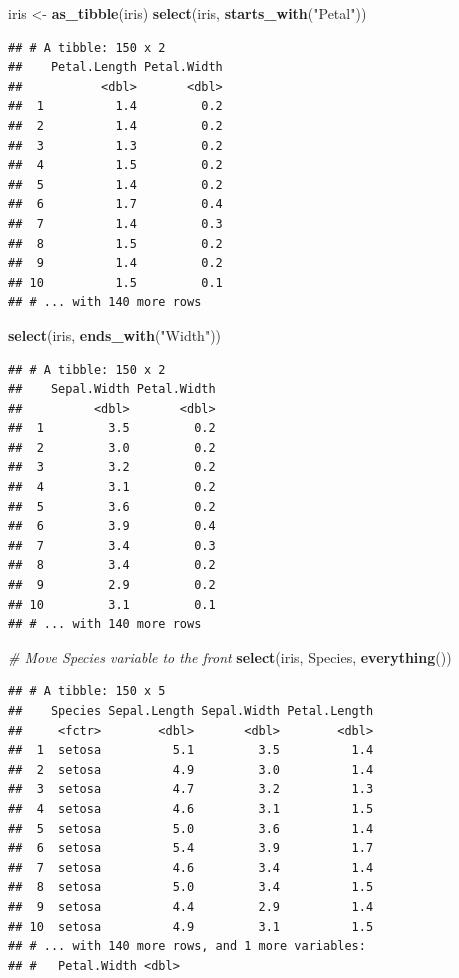 \documentclass[]{book}
\newenvironment{Shaded}{\begin{snugshade}}{\end{snugshade}}
\newcommand{\KeywordTok}[1]{\textcolor[rgb]{0.13,0.29,0.53}{\textbf{#1}}}
\newcommand{\StringTok}[1]{\textcolor[rgb]{0.31,0.60,0.02}{#1}}
\newcommand{\CommentTok}[1]{\textcolor[rgb]{0.56,0.35,0.01}{\textit{#1}}}
\newcommand{\NormalTok}[1]{#1}
\begin{document}
\begin{Shaded}
\begin{Highlighting}[]
\NormalTok{iris <-}\StringTok{ }\KeywordTok{as_tibble}\NormalTok{(iris)}
\KeywordTok{select}\NormalTok{(iris, }\KeywordTok{starts_with}\NormalTok{(}\StringTok{"Petal"}\NormalTok{))}
\end{Highlighting}
\end{Shaded}

\begin{verbatim}
## # A tibble: 150 x 2
##    Petal.Length Petal.Width
##           <dbl>       <dbl>
##  1          1.4         0.2
##  2          1.4         0.2
##  3          1.3         0.2
##  4          1.5         0.2
##  5          1.4         0.2
##  6          1.7         0.4
##  7          1.4         0.3
##  8          1.5         0.2
##  9          1.4         0.2
## 10          1.5         0.1
## # ... with 140 more rows
\end{verbatim}

\begin{Shaded}
\begin{Highlighting}[]
\KeywordTok{select}\NormalTok{(iris, }\KeywordTok{ends_with}\NormalTok{(}\StringTok{"Width"}\NormalTok{))}
\end{Highlighting}
\end{Shaded}

\begin{verbatim}
## # A tibble: 150 x 2
##    Sepal.Width Petal.Width
##          <dbl>       <dbl>
##  1         3.5         0.2
##  2         3.0         0.2
##  3         3.2         0.2
##  4         3.1         0.2
##  5         3.6         0.2
##  6         3.9         0.4
##  7         3.4         0.3
##  8         3.4         0.2
##  9         2.9         0.2
## 10         3.1         0.1
## # ... with 140 more rows
\end{verbatim}

\begin{Shaded}
\begin{Highlighting}[]
\CommentTok{# Move Species variable to the front}
\KeywordTok{select}\NormalTok{(iris, Species, }\KeywordTok{everything}\NormalTok{())}
\end{Highlighting}
\end{Shaded}

\begin{verbatim}
## # A tibble: 150 x 5
##    Species Sepal.Length Sepal.Width Petal.Length
##     <fctr>        <dbl>       <dbl>        <dbl>
##  1  setosa          5.1         3.5          1.4
##  2  setosa          4.9         3.0          1.4
##  3  setosa          4.7         3.2          1.3
##  4  setosa          4.6         3.1          1.5
##  5  setosa          5.0         3.6          1.4
##  6  setosa          5.4         3.9          1.7
##  7  setosa          4.6         3.4          1.4
##  8  setosa          5.0         3.4          1.5
##  9  setosa          4.4         2.9          1.4
## 10  setosa          4.9         3.1          1.5
## # ... with 140 more rows, and 1 more variables:
## #   Petal.Width <dbl>
\end{verbatim}
\end{document}
